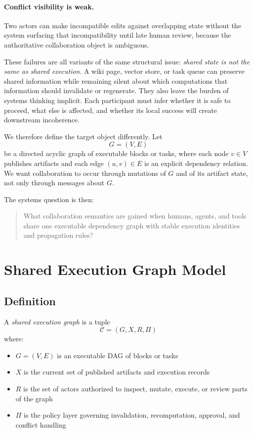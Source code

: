 \documentclass{article}
\begin{document}
\paragraph{Conflict visibility is weak.}
Two actors can make incompatible edits against overlapping state without the system surfacing that incompatibility until late human review, because the authoritative collaboration object is ambiguous.

These failures are all variants of the same structural issue: \emph{shared state is not the same as shared execution}. A wiki page, vector store, or task queue can preserve shared information while remaining silent about which computations that information should invalidate or regenerate. They also leave the burden of systems thinking implicit. Each participant must infer whether it is safe to proceed, what else is affected, and whether its local success will create downstream incoherence.

We therefore define the target object differently. Let
\begin{equation}
G = (V, E)
\end{equation}
be a directed acyclic graph of executable blocks or tasks, where each node $v \in V$ publishes artifacts and each edge $(u,v)\in E$ is an explicit dependency relation. We want collaboration to occur through mutations of $G$ and of its artifact state, not only through messages about $G$.

The systems question is then:
\begin{quote}
What collaboration semantics are gained when humans, agents, and tools share one executable dependency graph with stable execution identities and propagation rules?
\end{quote}

\section{Shared Execution Graph Model}

\subsection{Definition}

A \emph{shared execution graph} is a tuple
\begin{equation}
\mathcal{C} = (G, X, R, \Pi)
\end{equation}
where:
\begin{itemize}
\item $G=(V,E)$ is an executable DAG of blocks or tasks
\item $X$ is the current set of published artifacts and execution records
\item $R$ is the set of actors authorized to inspect, mutate, execute, or review parts of the graph
\item $\Pi$ is the policy layer governing invalidation, recomputation, approval, and conflict handling
\end{itemize}
\end{document}

